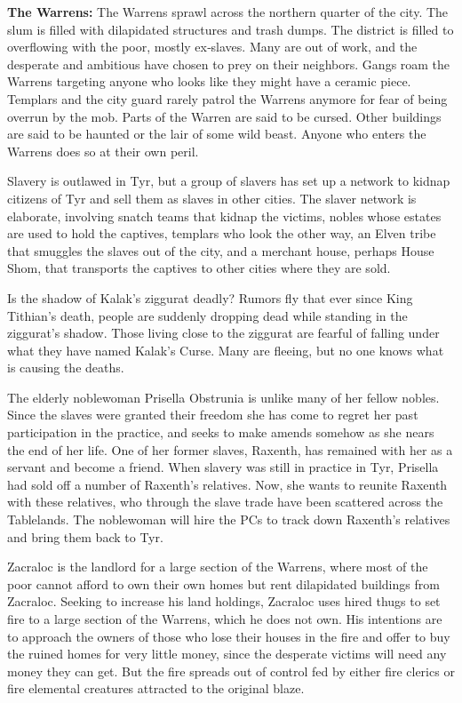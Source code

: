 {	\textbf{The Warrens:} The Warrens sprawl across the northern quarter of the city. The slum is filled with dilapidated structures and trash dumps. The district is filled to overflowing with the poor, mostly ex‐slaves. Many are out of work, and the desperate and ambitious have chosen to prey on their neighbors. Gangs roam the Warrens targeting anyone who looks like they might have a ceramic piece. Templars and the city guard rarely patrol the Warrens anymore for fear of being overrun by the mob. Parts of the Warren are said to be cursed. Other buildings are said to be haunted or the lair of some wild beast. Anyone who enters the Warrens does so at their own peril.
}
{
	\item Slavery is outlawed in Tyr, but a group of slavers has set up a network to kidnap citizens of Tyr and sell them as slaves in other cities. The slaver network is elaborate, involving snatch teams that kidnap the victims, nobles whose estates are used to hold the captives, templars who look the other way, an Elven tribe that smuggles the slaves out of the city, and a merchant house, perhaps House Shom, that transports the captives to other cities where they are sold.
	\item Is the shadow of Kalak’s ziggurat deadly? Rumors fly that ever since King Tithian’s death, people are suddenly dropping dead while standing in the ziggurat’s shadow. Those living close to the ziggurat are fearful of falling under what they have named Kalak’s Curse. Many are fleeing, but no one knows what is causing the deaths.
	\item The elderly noblewoman Prisella Obstrunia is unlike many of her fellow nobles. Since the slaves were granted their freedom she has come to regret her past participation in the practice, and seeks to make amends somehow as she nears the end of her life. One of her former slaves, Raxenth, has remained with her as a servant and become a friend. When slavery was still in practice in Tyr, Prisella had sold off a number of Raxenth’s relatives. Now, she wants to reunite Raxenth with these relatives, who through the slave trade have been scattered across the Tablelands. The noblewoman will hire the PCs to track down Raxenth’s relatives and bring them back to Tyr.
	\item Zacraloc is the landlord for a large section of the Warrens, where most of the poor cannot afford to own their own homes but rent dilapidated buildings from Zacraloc. Seeking to increase his land holdings, Zacraloc uses hired thugs to set fire to a large section of the Warrens, which he does not own. His intentions are to approach the owners of those who lose their houses in the fire and offer to buy the ruined homes for very little money, since the desperate victims will need any money they can get. But the fire spreads out of control fed by either fire clerics or fire elemental creatures attracted to the original blaze.
}
